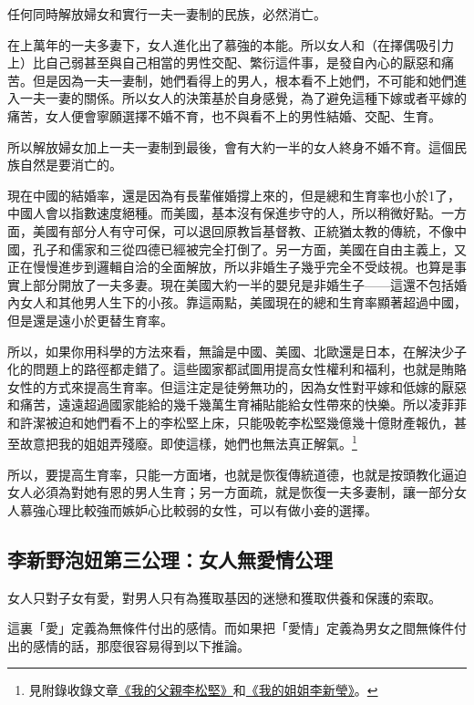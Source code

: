 \begin{theorem}\label{t2}
任何同時解放婦女和實行一夫一妻制的民族，必然消亡。
\end{theorem}

在上萬年的一夫多妻下，女人進化出了慕強的本能。所以女人和（在擇偶吸引力上）比自己弱甚至與自己相當的男性交配、繁衍這件事，是發自內心的厭惡和痛苦。但是因為一夫一妻制，她們看得上的男人，根本看不上她們，不可能和她們進入一夫一妻的關係。所以女人的決策基於自身感覺，為了避免這種下嫁或者平嫁的痛苦，女人便會寧願選擇不婚不育，也不與看不上的男性結婚、交配、生育。

所以解放婦女加上一夫一妻制到最後，會有大約一半的女人終身不婚不育。這個民族自然是要消亡的。

現在中國的結婚率，還是因為有長輩催婚撐上來的，但是總和生育率也小於1了，中國人會以指數速度絕種。而美國，基本沒有保進步守的人，所以稍微好點。一方面，美國有部分人有守可保，可以退回原教旨基督教、正統猶太教的傳統，不像中國，孔子和儒家和三從四德已經被完全打倒了。另一方面，美國在自由主義上，又正在慢慢進步到邏輯自洽的全面解放，所以非婚生子幾乎完全不受歧視。也算是事實上部分開放了一夫多妻。現在美國大約一半的嬰兒是非婚生子——這還不包括婚內女人和其他男人生下的小孩。靠這兩點，美國現在的總和生育率顯著超過中國，但是還是遠小於更替生育率。

所以，如果你用科學的方法來看，無論是中國、美國、北歐還是日本，在解決少子化的問題上的路徑都走錯了。這些國家都試圖用提高女性權利和福利，也就是賄賂女性的方式來提高生育率。但這注定是徒勞無功的，因為女性對平嫁和低嫁的厭惡和痛苦，遠遠超過國家能給的幾千幾萬生育補貼能給女性帶來的快樂。所以凌菲菲和許潔被迫和她們看不上的李松堅上床，只能吸乾李松堅幾億幾十億財產報仇，甚至故意把我的姐姐弄殘廢。即使這樣，她們也無法真正解氣。\footnote{見附錄收錄文章\hyperref[3faces]{《我的父親李松堅》}和\hyperref[sister]{《我的姐姐李新瑩》}。}

所以，要提高生育率，只能一方面堵，也就是恢復傳統道德，也就是按頭教化逼迫女人必須為對她有恩的男人生育；另一方面疏，就是恢復一夫多妻制，讓一部分女人慕強心理比較強而嫉妒心比較弱的女性，可以有做小妾的選擇。

\subsection{李新野泡妞第三公理：女人無愛情公理}

\begin{axiom}\label{a3}
女人只對子女有愛，對男人只有為獲取基因的迷戀和獲取供養和保護的索取。
\end{axiom}

這裏「愛」定義為無條件付出的感情。而如果把「愛情」定義為男女之間無條件付出的感情的話，那麼很容易得到以下推論。

